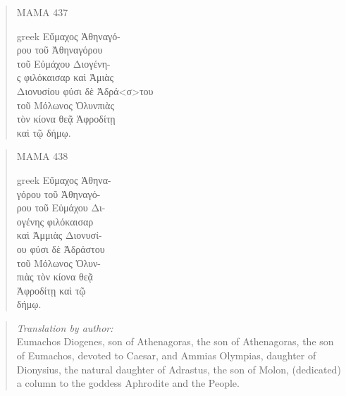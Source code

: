 \documentclass[amsthm,ebook]{saparticle}
\begin{document}
\begin{quotation}
\noindent MAMA 437\\
\begin{otherlanguage*}{greek}
\noindent Εὔμαχος Ἀθηναγό-\\
ρου τοῦ Ἀθηναγόρου\\
τοῦ Εὐμάχου Διογένη-\\
ς φιλόκαισαρ καὶ Ἀμιὰς\\
Διονυσίου φύσι δὲ Ἀδρά<σ>του\\
τοῦ Μόλωνος Ὀλυνπιὰς\\
τὸν κίονα θεᾷ Ἀφροδίτῃ\\
καὶ τῷ δήμῳ.
\end{otherlanguage*}
\end{quotation}

\begin{quotation}
\noindent MAMA 438 \\
\begin{otherlanguage*}{greek}
\noindent Εὔμαχος Ἀθηνα-\\
γόρου τοῦ Ἀθηναγό-\\
ρου τοῦ Εὐμάχου Δι-\\
ογένης φιλόκαισαρ\\
καὶ Ἀμμιὰς Διονυσί-\\
ου φύσι δὲ Ἀδράστου\\
τοῦ Μόλωνος Ὀλυν-\\
πιὰς τὸν κίονα θεᾷ\\
Ἀφροδίτῃ καὶ τῷ\\
δήμῳ.
\end{otherlanguage*}
\end{quotation}

\begin{quotation}
\emph{Translation by author:}\\
Eumachos Diogenes, son of Athenagoras, the son of Athenagoras, the son of Eumachos, devoted to Caesar, and Ammias Olympias, daughter of Dionysius, the natural daughter of Adrastus, the son of Molon, (dedicated) a column to the goddess Aphrodite and the People.  
\end{quotation}
\end{document}
